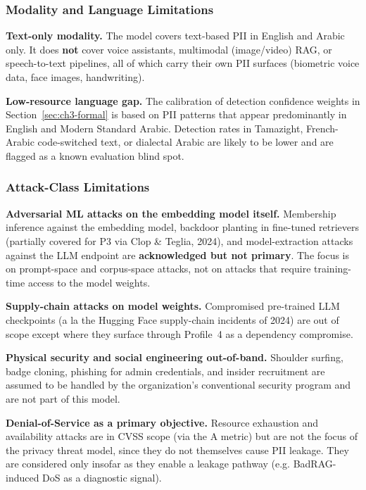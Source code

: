 \subsubsection{Modality and Language Limitations}

\begin{limitbox}
\textbf{Text-only modality.} The model covers text-based PII in English
and Arabic only. It does \textbf{not} cover voice assistants, multimodal
(image/video) RAG, or speech-to-text pipelines, all of which carry their
own PII surfaces (biometric voice data, face images, handwriting).

\textbf{Low-resource language gap.} The calibration of detection
confidence weights in Section~\ref{sec:ch3-formal} is based on PII patterns that appear
predominantly in English and Modern Standard Arabic. Detection rates in
Tamazight, French-Arabic code-switched text, or dialectal Arabic are
likely to be lower and are flagged as a known evaluation blind spot.
\end{limitbox}

\subsubsection{Attack-Class Limitations}

\begin{limitbox}
\textbf{Adversarial ML attacks on the embedding model itself.}
Membership inference against the embedding model, backdoor planting in
fine-tuned retrievers (partially covered for P3 via Clop \& Teglia, 2024),
and model-extraction attacks against the LLM endpoint are
\textbf{acknowledged but not primary}. The focus is on prompt-space and
corpus-space attacks, not on attacks that require training-time access to
the model weights.

\textbf{Supply-chain attacks on model weights.} Compromised pre-trained
LLM checkpoints (a la the Hugging Face supply-chain incidents of 2024)
are out of scope except where they surface through Profile~4 as a
dependency compromise.

\textbf{Physical security and social engineering out-of-band.} Shoulder
surfing, badge cloning, phishing for admin credentials, and insider
recruitment are assumed to be handled by the organization's conventional
security program and are not part of this model.

\textbf{Denial-of-Service as a primary objective.} Resource exhaustion
and availability attacks are in CVSS scope (via the A metric) but are
not the focus of the privacy threat model, since they do not themselves
cause PII leakage. They are considered only insofar as they enable
a leakage pathway (e.g. BadRAG-induced DoS as a diagnostic signal).
\end{limitbox}

